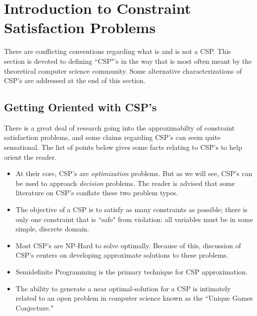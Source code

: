 %


\section{Introduction to Constraint Satisfaction Problems}
There are conflicting conventions regarding what is and is not a CSP. This section is devoted to defining ``CSP"'s in the way that is most often meant by the theoretical computer science community. Some alternative characterizations of CSP's are addressed at the end of this section. 
\subsection{Getting Oriented with CSP's}

There is a great deal of research going into the approximabilty of constraint satisfaction problems, and some claims regarding CSP's can seem quite sensational. 
The list of points below gives some facts relating to CSP's to help orient the reader.

\begin{itemize}
\item At their core, CSP's are \textit{optimization} problems. But as we will see, CSP's can be used to approach \textit{decision} problems. The reader is advised that some literature on CSP's conflate these two problem types.
\item The objective of a CSP is to satisfy as many constraints as possible; there is only one constraint that is ``safe" from violation: all variables must be in some simple, discrete domain.
\item Most CSP's are NP-Hard to solve optimally. Because of this, discussion of CSP's centers on developing approximate solutions to these problems.
\item Semidefinite Programming is the primary technique for CSP approximation.
\item The ability to generate a near optimal-solution for a CSP is intimately related to an open problem in computer science known as the ``Unique Games Conjecture."
\end{itemize}

